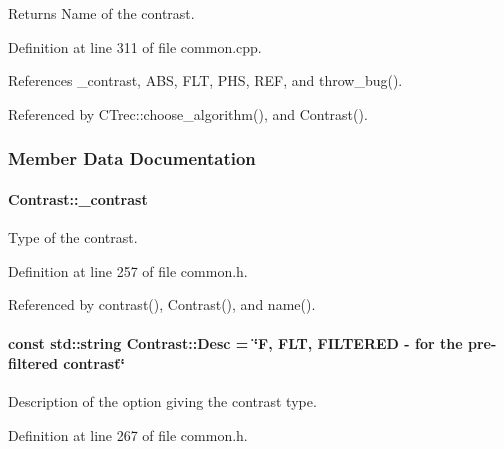 \begin{DoxyReturn}{Returns}
Name of the contrast. 
\end{DoxyReturn}


Definition at line 311 of file common.cpp.



References \_\-contrast, ABS, FLT, PHS, REF, and throw\_\-bug().



Referenced by CTrec::choose\_\-algorithm(), and Contrast().



\subsubsection{Member Data Documentation}
\hypertarget{classContrast_ac333f4983aae5b900d5cc57f4ff51453}{
\paragraph[{\_\-contrast}]{ {\bf Contrast::\_\-contrast}}\hfill}
\label{classContrast_ac333f4983aae5b900d5cc57f4ff51453}


Type of the contrast. 



Definition at line 257 of file common.h.



Referenced by contrast(), Contrast(), and name().

\hypertarget{classContrast_add7b49ae6e98cb290c7d1df3eefc6330}{
\paragraph[{Desc}]{\setlength{\rightskip}{0pt plus 5cm}const std::string {\bf Contrast::Desc} = \char`\"{}F, FLT, FILTERED -\/ for the pre-\/filtered contrast\char`\"{}}\hfill}
\label{classContrast_add7b49ae6e98cb290c7d1df3eefc6330}


Description of the option giving the contrast type. 



Definition at line 267 of file common.h.

